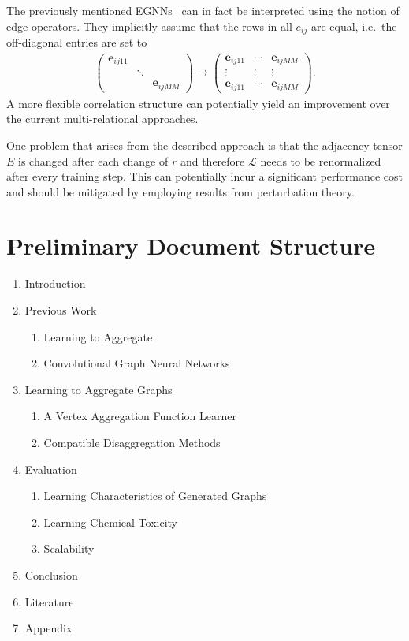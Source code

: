 \documentclass[12pt]{scrartcl}
\begin{document}
The previously mentioned EGNNs~\cite{Gong2018} can in fact be interpreted using the notion of edge operators.
They implicitly assume that the rows in all $e_{ij}$ are equal, i.e.\ the off-diagonal entries are set to
\begin{align*}
	\begin{pmatrix}
		\bm{e}_{ij11} & & \\
		& \ddots & \\
		& & \bm{e}_{ijMM}
	\end{pmatrix} \rightarrow \begin{pmatrix}
		\bm{e}_{ij11} & \cdots & \bm{e}_{ijMM} \\
		\vdots & \vdots & \vdots \\
		\bm{e}_{ij11} & \cdots & \bm{e}_{ijMM}
	\end{pmatrix}\text{.}
\end{align*}
A more flexible correlation structure can potentially yield an improvement over the current multi-relational approaches.

One problem that arises from the described approach is that the adjacency tensor $E$ is changed after each change of $r$ and therefore $\mathcal{L}$ needs to be renormalized after every training step.
This can potentially incur a significant performance cost and should be mitigated by employing results from perturbation theory.

\section{Preliminary Document Structure}%
\label{sec:doc-structure}

\begin{enumerate}
	\item Introduction
	\item Previous Work
		\begin{enumerate}[label*=\arabic*.]
			\item Learning to Aggregate
			\item Convolutional Graph Neural Networks
		\end{enumerate}
	\item Learning to Aggregate Graphs
	\begin{enumerate}[label*=\arabic*.]
		\item A Vertex Aggregation Function Learner
		\item Compatible Disaggregation Methods
	\end{enumerate}
	\item Evaluation
		\begin{enumerate}[label*=\arabic*.]
			\item Learning Characteristics of Generated Graphs
			\item Learning Chemical Toxicity
			\item Scalability
		\end{enumerate}
	\item Conclusion
	\item Literature
	\item Appendix
\end{enumerate}
\end{document}
